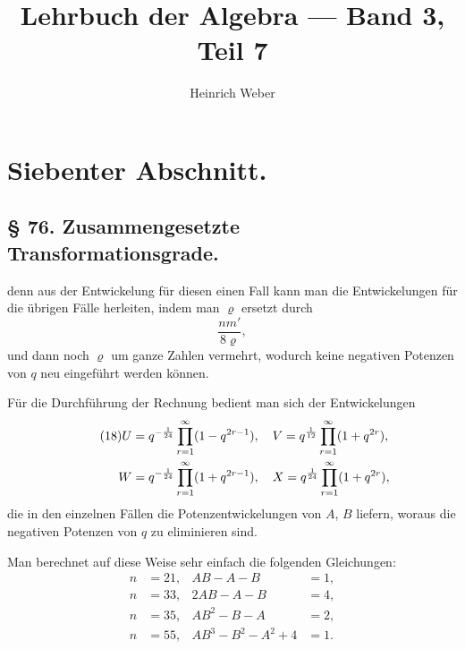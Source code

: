 \documentclass[12pt,a4paper]{article}
\title{Lehrbuch der Algebra --- Band 3, Teil 7}
\author{Heinrich Weber}
\date{}
\theoremstyle{definition}
\begin{document}
\maketitle
\thispagestyle{empty}

\section*{Siebenter Abschnitt.}

\subsection*{\S{} 76. Zusammengesetzte Transformationsgrade.}

denn aus der Entwickelung f\"ur diesen einen Fall kann man die
Entwickelungen f\"ur die \"ubrigen F\"alle herleiten, indem man $\varrho$
ersetzt durch
\begin{equation}\tag{17}
\frac{nm'}{8\varrho},
\end{equation}
und dann noch $\varrho$ um ganze Zahlen vermehrt, wodurch keine
negativen Potenzen von $q$ neu eingef\"uhrt werden k\"onnen.

F\"ur die Durchf\"uhrung der Rechnung bedient man sich der
Entwickelungen
\begin{align}\tag{18}
U &= q^{-\frac{1}{24}} \prod_{r=1}^{\infty} (1 - q^{2r-1}), \quad
V = q^{\frac{1}{12}} \prod_{r=1}^{\infty} (1 + q^{2r}), \notag \\
W &= q^{-\frac{1}{24}} \prod_{r=1}^{\infty} (1 + q^{2r-1}), \quad
X = q^{\frac{1}{24}} \prod_{r=1}^{\infty} (1 + q^{2r}), \notag
\end{align}
die in den einzelnen F\"allen die Potenzentwickelungen von $A$, $B$
liefern, woraus die negativen Potenzen von $q$ zu eliminieren sind.

Man berechnet auf diese Weise sehr einfach die folgenden
Gleichungen:
\begin{equation}\tag{19}
\begin{aligned}
n &= 21, & AB - A - B &= 1, \\
n &= 33, & 2AB - A - B &= 4, \\
n &= 35, & AB^2 - B - A &= 2, \\
n &= 55, & AB^3 - B^2 - A^2 + 4 &= 1.
\end{aligned}
\end{equation}
\end{document}
